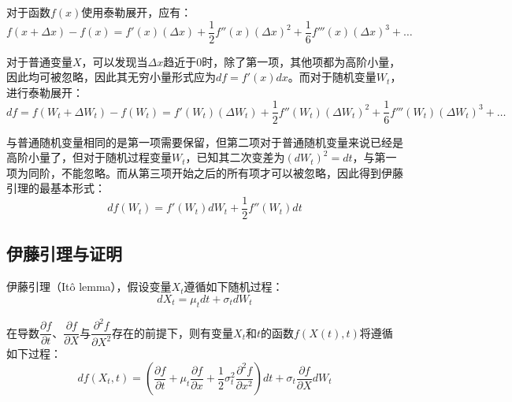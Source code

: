 \documentclass[11pt]{article}
\begin{document}
对于函数$f(x)$使用泰勒展开，应有：
\begin{equation*}
    f(x + \Delta x) - f(x)= f'(x)(\Delta x) + \frac{1}{2} f''(x)(\Delta x)^2 + \frac{1}{6} f'''(x)(\Delta x)^3 + \dots
\end{equation*}

对于普通变量$X$，可以发现当$\Delta x$趋近于$0$时，除了第一项，其他项都为高阶小量，因此均可被忽略，因此其无穷小量形式应为$df=f'(x)dx$。而对于随机变量$W_t$，进行泰勒展开：
\begin{equation*}
    df = f(W_t + \Delta W_t) - f(W_t)= f'(W_t)(\Delta W_t) + \frac{1}{2} f''(W_t)(\Delta W_t)^2 + \frac{1}{6} f'''(W_t)(\Delta W_t)^3 + \dots
\end{equation*}

与普通随机变量相同的是第一项需要保留，但第二项对于普通随机变量来说已经是高阶小量了，但对于随机过程变量$W_t$，已知其二次变差为$(dW_t)^2 = dt$，与第一项为同阶，不能忽略。而从第三项开始之后的所有项才可以被忽略，因此得到伊藤引理的最基本形式：
\begin{equation*}
    df(W_t) =f'(W_t)dW_t + \frac{1}{2}f''(W_t)dt
\end{equation*}

\subsection{伊藤引理与证明}

\begin{lemma}
    伊藤引理（Itô lemma），假设变量$X_t$遵循如下随机过程：
    \begin{equation*}
        dX_t =\mu_t dt + \sigma_t dW_t
    \end{equation*}

    在导数$\dfrac{\partial f}{\partial t}$、$\dfrac{\partial f}{\partial X}$与$\dfrac{\partial^2 f}{\partial X^2}$存在的前提下，则有变量$X_t$和$t$的函数$f(X(t),t)$将遵循如下过程：
    \begin{equation*}
        df(X_t,t) = \left(\frac{\partial f}{\partial t} + \mu_t \frac{\partial f}{\partial x} + \frac{1}{2} \sigma_t^2 \frac{\partial^2 f}{\partial x^2} \right)dt + \sigma_t \frac{\partial f}{\partial X} dW_t
    \end{equation*}
\end{lemma}
\end{document}
